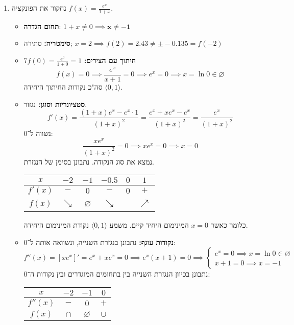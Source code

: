 \documentclass[]{article}
\newcommand\ra    {\rangle}
\newcommand\la    {\langle}
\begin{document}
	\begin{enumerate}
		\item נחקור את הפונקציה $f(x) = \frac{e^{x}}{1 + x}$. 
		\begin{itemize}
			\item \textbf{תחום הגדרה}:
				$1 + x \neq 0 \implies \bm{x \neq -1}$
			\item \textbf{סימטריה:} סתירה; $x = 2 \implies f(2) = 2.43 \neq \pm -0.135 = f(-2)$
			\item \textbf{חיתוך עם הצירים:} $f(0) = \frac{e^{0}}{1 + 0} = 1$7
			\[ f(x) = 0 \implies \frac{e^{x}}{x + 1} = 0 \implies e^{x} = 0 \implies x = \ln 0 \in \varnothing \]
			סה"כ נקודות החיתוך היחידה $\la 0, 1 \ra$. 
			\item \textbf{סטציונריות וסוגן:} נגזור. 
			\[ f'(x) = \frac{(1 + x)e^{x} - e^x \cdot 1}{(1 + x)^2} = \frac{e^x + xe^x - e^x}{(1 + x)^2} = \frac{e^x}{(1 + x)^2} \]
			נשווה ל־0: 
			\[ \frac{xe^x}{(1 + x)^2} = 0 \implies xe^x = 0 \implies x = 0 \]
			נמצא את סוג הנקודה. נתבונן בסימן של הנגזרת. 
			\begin{center}
				\begin{tabular}{|c|c|c|c|c|c|}
					\hline $x$ & $-2$& $-1$ & $-0.5$ & $0$ & $1$ \\
					\hline $f'(x)$ & $-$ & $0$ & $-$ & $0$ & $+$ \\
					\hline $f(x)$ & $\searrow$ & $\varnothing$ & $\searrow$ &  \ & $\nearrow$ \\
					\hline
				\end{tabular}
			\end{center}
			כלומר כאשר $x = 0$ המינימום היחיד קיים. משמע $\la 0, 1 \ra$ נקודת המינימום היחידה. 
			\item \textbf{נקודות עוגף: }נתבונן בנגזרת השנייה, ונשוואה אותה ל־0: 
			\[ f''(x) = [xe^x]' = e^x + xe^x = 0 \implies e^x(x + 1) = 0 \implies \begin{cases}
				e^x = 0 \implies x = \ln 0 \in \varnothing \\
				x + 1 = 0 \implies x = -1
			\end{cases} \]
			נתבונן בכיוון הנגזרת השנייה בין בתחומים המוגדרים ובין נקודות ה־0: 
			\begin{center}
				\begin{tabular}{|c|c|c|c|}
					\hline $x$ & $-2$ & $-1$ & $0$ \\
					\hline $f''(x)$ & $-$ & $0$ & $+$ \\
					\hline $f(x)$ & $\cap$ & $\varnothing$ & $\cup$ \\
					\hline
				\end{tabular}

\end{center}
\end{itemize}
\end{enumerate}
\end{document}
